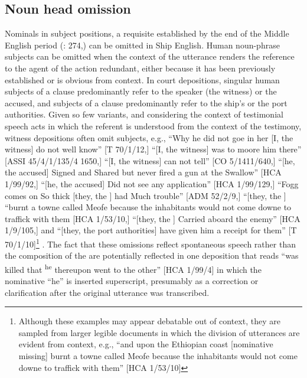 \subsection{{Noun head omission} }%

Nominals in subject positions, a requisite established by the end of the Middle English period (\citealt{MillwardHayes2012}: 274,) can be omitted in Ship English. Human noun-phrase subjects can be omitted when the context of the utterance renders the reference to the agent of the action redundant, either because it has been previously established or is obvious from context. In court depositions, singular human subjects of a clause predominantly refer to the speaker (the witness) or the accused, and  subjects of a clause predominantly refer to the ship’s  or the port authorities. Given so few variants, and considering the context of testimonial speech acts in which the referent is understood from the context of the testimony, witness depositions often omit  subjects, e.g., “Why he did not goe in her [I, the witness] do not well know” [T 70/1/12,] “[I, the witness] was to moore him there” [ASSI 45/4/1/135/4 1650,] “[I, the witness] can not tell” [CO 5/1411/640,] “[he, the accused] Signed and Shared but never fired a gun at the Swallow” [HCA 1/99/92,] “[he, the accused] Did not see any application” [HCA 1/99/129,] “Fogg comes on So thick [they, the ] had Much trouble” [ADM 52/2/9,] “[they, the ] “burnt a towne called Meofe because the inhabitants would not come downe to traffick with them [HCA 1/53/10,] “[they, the ] Carried aboard the enemy” [HCA 1/9/105,] and “[they, the port authorities] have given him a receipt for them” [T 70/1/10]\footnote{Although these examples may appear debatable out of context, they are sampled from larger legible documents in which the division of utterances are evident from context, e.g., “and upon the Ethiopian coast [nominative missing] burnt a towne called Meofe because the inhabitants would not come downe to traffick with them” [HCA 1/53/10]} . The fact that these omissions reflect spontaneous speech rather than the composition of the  are potentially reflected in one deposition that reads “was killed that \textsuperscript{he} thereupon went to the other” [HCA 1/99/4] in which the nominative  “he” is inserted superscript, presumably as a correction or clarification after the original utterance was transcribed. 

